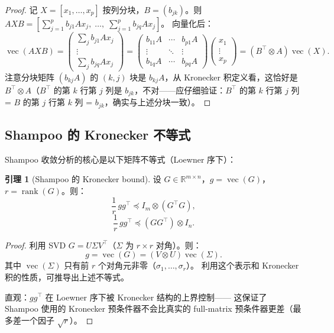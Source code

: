 \documentclass[12pt,a4paper]{ctexart}
\theoremstyle{definition}
\newtheorem{lemma}[theorem]{引理}
\theoremstyle{plain}
\newcommand{\R}{\mathbb{R}}
\newcommand{\vect}{\operatorname{vec}}
\DeclareMathOperator{\rank}{rank}
\begin{document}
\begin{proof}
  记 $X=[x_1,\ldots,x_p]$ 按列分块，$B=(b_{jk})$。则 $AXB = [\sum_{j=1}^p b_{j1}Ax_j,\;\ldots,\;\sum_{j=1}^p b_{jq}Ax_j]$。
  向量化后：
  \[
    \vect(AXB) = \begin{pmatrix}
      \sum_j b_{j1}Ax_j \\
      \vdots \\
      \sum_j b_{jq}Ax_j
    \end{pmatrix}
    = \begin{pmatrix}
      b_{11}A & \cdots & b_{p1}A \\
      \vdots & \ddots & \vdots \\
      b_{1q}A & \cdots & b_{pq}A
    \end{pmatrix}
    \begin{pmatrix} x_1 \\ \vdots \\ x_p \end{pmatrix}
    = (B^\top\otimes A)\vect(X).
  \]
  注意分块矩阵 $(b_{kj}A)$ 的 $(k,j)$ 块是 $b_{kj}A$，从 Kronecker 积定义看，这恰好是 $B^\top\otimes A$（$B^\top$ 的第 $k$ 行第 $j$ 列是 $b_{jk}$，不对——应仔细验证：$B^\top$ 的第 $k$ 行第 $j$ 列 = $B$ 的第 $j$ 行第 $k$ 列 = $b_{jk}$，确实与上述分块一致）。
\end{proof}

\subsection{Shampoo 的 Kronecker 不等式}

Shampoo 收敛分析的核心是以下矩阵不等式（Loewner 序下）：

\begin{lemma}[Shampoo 的 Kronecker bound]\label{lem:shampoo-bound}
  设 $G\in\R^{m\times n}$，$g=\vect(G)$，$r=\rank(G)$。则：
  \begin{equation}\label{eq:shampoo-kron1}
    \frac{1}{r}\,gg^\top \preceq I_m\otimes(G^\top G),
  \end{equation}
  \begin{equation}\label{eq:shampoo-kron2}
    \frac{1}{r}\,gg^\top \preceq (GG^\top)\otimes I_n.
  \end{equation}
\end{lemma}

\begin{proof}
  利用 SVD $G=U\Sigma V^\top$（$\Sigma$ 为 $r\times r$ 对角）。则：
  \[
    g = \vect(G) = (V\otimes U)\vect(\Sigma).
  \]
  其中 $\vect(\Sigma)$ 只有前 $r$ 个对角元非零（$\sigma_1,\ldots,\sigma_r$）。
  利用这个表示和 Kronecker 积的性质，可推导出上述不等式。

  直观：$gg^\top$ 在 Loewner 序下被 Kronecker 结构的上界控制——
  这保证了 Shampoo 使用的 Kronecker 预条件器不会比真实的 full-matrix 预条件器更差（最多差一个因子 $\sqrt{r}$）。
\end{proof}
\end{document}
